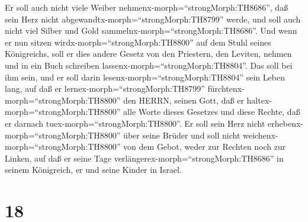  Er soll auch nicht viele Weiber
nehmenx-morph=``strongMorph:TH8686'', daß sein Herz nicht
abgewandtx-morph=``strongMorph:TH8799'' werde, und soll auch nicht viel
Silber und Gold sammelnx-morph=``strongMorph:TH8686''.  Und
wenn er nun sitzen wirdx-morph=``strongMorph:TH8800'' auf dem Stuhl
seines Königreichs, soll er dies andere Gesetz von den Priestern, den
Leviten, nehmen und in ein Buch schreiben
lassenx-morph=``strongMorph:TH8804''.  Das soll bei ihm
sein, und er soll darin lesenx-morph=``strongMorph:TH8804'' sein Leben
lang, auf daß er lernex-morph=``strongMorph:TH8799''
fürchtenx-morph=``strongMorph:TH8800'' den HERRN, seinen Gott, daß er
haltex-morph=``strongMorph:TH8800'' alle Worte dieses Gesetzes und diese
Rechte, daß er darnach tuex-morph=``strongMorph:TH8800''. 
Er soll sein Herz nicht erhebenx-morph=``strongMorph:TH8800'' über seine
Brüder und soll nicht weichenx-morph=``strongMorph:TH8800'' von dem
Gebot, weder zur Rechten noch zur Linken, auf daß er seine Tage
verlängerex-morph=``strongMorph:TH8686'' in seinem Königreich, er und
seine Kinder in Israel.

\hypertarget{section-17}{%
\section{18}\label{section-17}}

